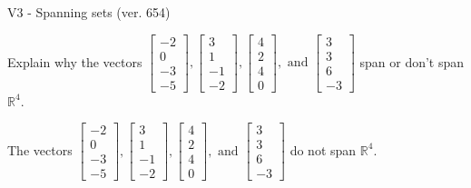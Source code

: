 \begin{exercise}
  \begin{exerciseTitle}V3 - Spanning sets (ver. 654)\end{exerciseTitle}
  \begin{exerciseStatement}
    Explain why the vectors \(\left[\begin{array}{r}
-2 \\
0 \\
-3 \\
-5
\end{array}\right] , \left[\begin{array}{r}
3 \\
1 \\
-1 \\
-2
\end{array}\right] , \left[\begin{array}{r}
4 \\
2 \\
4 \\
0
\end{array}\right] , \text{ and } \left[\begin{array}{r}
3 \\
3 \\
6 \\
-3
\end{array}\right]\) span or don't span \(\mathbb{R}^4\). 
	


  \end{exerciseStatement}
  \begin{exerciseAnswer}
   The vectors \(\left[\begin{array}{r}
-2 \\
0 \\
-3 \\
-5
\end{array}\right] , \left[\begin{array}{r}
3 \\
1 \\
-1 \\
-2
\end{array}\right] , \left[\begin{array}{r}
4 \\
2 \\
4 \\
0
\end{array}\right] , \text{ and } \left[\begin{array}{r}
3 \\
3 \\
6 \\
-3
\end{array}\right]\) 
  	 do not  
	span \(\mathbb{R}^4\).
  


  \end{exerciseAnswer}
\end{exercise}